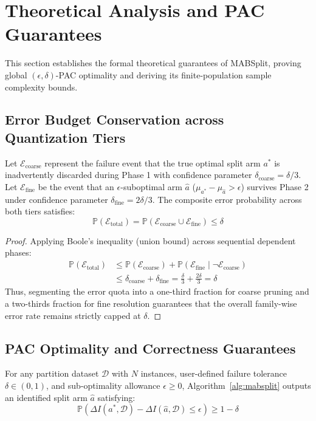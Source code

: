 \section{Theoretical Analysis and PAC Guarantees}
\label{sec:theoretical_guarantees}

This section establishes the formal theoretical guarantees of MABSplit, proving global $(\epsilon, \delta)$-PAC optimality and deriving its finite-population sample complexity bounds.

\subsection{Error Budget Conservation across Quantization Tiers}
\begin{lemma}
\label{lem:bonferroni}
Let $\mathcal{E}_{\text{coarse}}$ represent the failure event that the true optimal split arm $a^*$ is inadvertently discarded during Phase 1 with confidence parameter $\delta_{\text{coarse}} = \delta/3$. Let $\mathcal{E}_{\text{fine}}$ be the event that an $\epsilon$-suboptimal arm $\hat{a}$ ($\mu_{a^*} - \mu_{\hat{a}} > \epsilon$) survives Phase 2 under confidence parameter $\delta_{\text{fine}} = 2\delta/3$. The composite error probability across both tiers satisfies:
\begin{equation}
\mathbb{P}(\mathcal{E}_{\text{total}}) = \mathbb{P}(\mathcal{E}_{\text{coarse}} \cup \mathcal{E}_{\text{fine}}) \le \delta
\end{equation}
\end{lemma}

\begin{proof}
Applying Boole's inequality (union bound) across sequential dependent phases:
\begin{align}
\mathbb{P}(\mathcal{E}_{\text{total}}) &\le \mathbb{P}(\mathcal{E}_{\text{coarse}}) + \mathbb{P}(\mathcal{E}_{\text{fine}} \mid \neg\mathcal{E}_{\text{coarse}}) \\
&\le \delta_{\text{coarse}} + \delta_{\text{fine}} = \frac{\delta}{3} + \frac{2\delta}{3} = \delta
\end{align}
Thus, segmenting the error quota into a one-third fraction for coarse pruning and a two-thirds fraction for fine resolution guarantees that the overall family-wise error rate remains strictly capped at $\delta$.
\end{proof}

\subsection{PAC Optimality and Correctness Guarantees}
\begin{theorem}
\label{thm:pac_optimality}
For any partition dataset $\mathcal{D}$ with $N$ instances, user-defined failure tolerance $\delta \in (0, 1)$, and sub-optimality allowance $\epsilon \ge 0$, Algorithm~\ref{alg:mabsplit} outputs an identified split arm $\hat{a}$ satisfying:
\begin{equation}
\mathbb{P}\left(\Delta I(a^*, \mathcal{D}) - \Delta I(\hat{a}, \mathcal{D}) \le \epsilon \right) \ge 1 - \delta
\end{equation}
\end{theorem}

